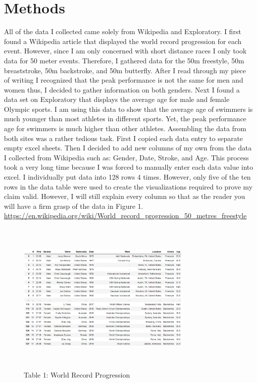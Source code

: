 \documentclass[letterpaper, 10 pt, conference]{ieeeconf}  %
\begin{document}
\section{Methods}
All of the data I collected came solely from Wikipedia and Exploratory. I first found a Wikipedia article that displayed the world record progression for each event. However, since I am only concerned with short distance races I only took data for 50 meter events. Therefore, I gathered data for the 50m freestyle, 50m breaststroke, 50m backstroke, and 50m butterfly. After I read through my piece of writing I recognized that the peak performance is not the same for men and women thus, I decided to gather information on both genders. Next I found a data set on Exploratory that displays the average age for male and female Olympic sports. I am using this data to show that the average age of swimmers is much younger than most athletes in different sports. Yet, the peak performance age for swimmers is much higher than other athletes. Assembling the data from both sites was a rather tedious task. First I copied each data entry to separate empty excel sheets. Then I decided to add new columns of my own from the data I collected from Wikipedia such as: Gender, Date, Stroke, and Age. This process took a very long time because I was forced to manually enter each data value into excel. I individually put data into 128 rows 4 times. However, only five of the ten rows in the data table were used to create the visualizations required to prove my claim valid. However, I will still explain every column so that as the reader you will have a firm grasp of the data in Figure 1. \url{https://en.wikipedia.org/wiki/World_record_progression_50_metres_freestyle} 
\begin{figure}
    \centering
    \includegraphics[width=8.5cm, height=7.5cm]{Data_Table}
    \caption{Table 1: World Record Progression}
    \label{Fig 1}
\end{figure}
\end{document}
